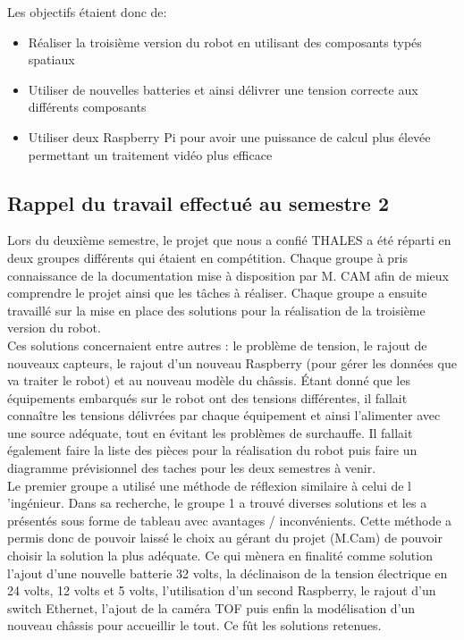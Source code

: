 \documentclass{PackagerQualityN}
\begin{document}
Les objectifs étaient donc de:
\begin{itemize}
\item  Réaliser la troisième version du robot en utilisant des composants typés spatiaux
\item  Utiliser de nouvelles batteries et ainsi délivrer une tension correcte aux différents composants
\item  Utiliser deux Raspberry Pi pour avoir une puissance de calcul plus élevée permettant un traitement vidéo plus efficace
\end{itemize}

\subsection*{Rappel du travail effectué au semestre 2}
Lors du deuxième semestre, le projet que nous a confié THALES a été réparti en deux groupes différents qui étaient en compétition. Chaque groupe à pris connaissance de la documentation mise à disposition par M. CAM afin de mieux comprendre le projet ainsi que les tâches à réaliser. Chaque groupe a ensuite travaillé sur la mise en place des solutions pour la réalisation de la troisième version du robot.\\

Ces solutions concernaient entre autres : le problème de tension, le rajout de nouveaux capteurs, le rajout d’un nouveau Raspberry (pour gérer les données que va traiter le robot) et au nouveau modèle du châssis. Étant donné que les équipements embarqués sur le robot ont des tensions différentes, il fallait connaître les tensions délivrées par chaque équipement et ainsi l'alimenter avec une source adéquate, tout en évitant les problèmes de surchauffe. Il fallait également faire la liste des pièces pour la réalisation du robot puis faire un diagramme prévisionnel des taches pour les deux semestres à venir.\\ %

Le premier groupe a utilisé une méthode de réflexion similaire à celui de l ’ingénieur. Dans sa recherche, le groupe 1 a trouvé diverses solutions et les a présentés sous forme de tableau avec avantages / inconvénients. Cette méthode a permis donc de pouvoir laissé le choix au gérant du projet (M.Cam) de pouvoir choisir la solution la plus adéquate. Ce qui mènera en finalité comme solution l’ajout d’une nouvelle batterie 32 volts, la déclinaison de la tension électrique en 24 volts, 12 volts et 5 volts, l’utilisation d’un second Raspberry, le rajout d’un switch Ethernet, l'ajout de la caméra TOF puis enfin la modélisation d'un nouveau châssis pour accueillir le tout. Ce fût les solutions retenues.\\
\end{document}
